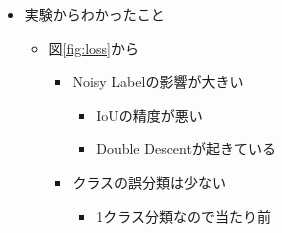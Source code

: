 \documentclass[a4j]{ujarticle}
\newcommand{\Fref}[1]{\mbox{図\ref{fig:#1}}}
\begin{document}
\begin{itemize}
            \item 実験からわかったこと
            \begin{itemize}
                \item \Fref{loss}から
                \begin{itemize}
                    \item Noisy Labelの影響が大きい
                    \begin{itemize}
                        \item IoUの精度が悪い
                        \item Double Descentが起きている
                    \end{itemize}
                    \item クラスの誤分類は少ない
                    \begin{itemize}
                        \item 1クラス分類なので当たり前
                    \end{itemize}
                \end{itemize}
            \end{itemize}
        \end{itemize}
\end{document}
